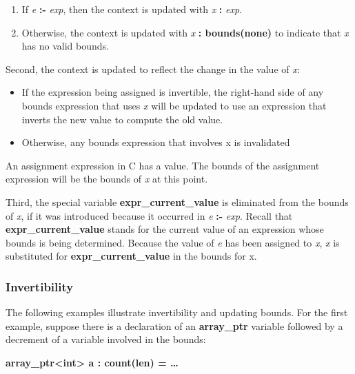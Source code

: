 \documentclass[]{article}
\begin{document}
\begin{enumerate}
\def\labelenumi{\arabic{enumi}.}
\item
  If \emph{e} \textbf{:-} \emph{exp}, then the context is updated with
  \emph{x} \textbf{:} \emph{exp}.
\item
  Otherwise, the context is updated with \emph{x} \textbf{:
  bounds(none)} to indicate that \emph{x} has no valid bounds.
\end{enumerate}

Second, the context is updated to reflect the change in the value of
\emph{x}:

\begin{itemize}
\item
  If the expression being assigned is invertible, the right-hand side of
  any bounds expression that uses \emph{x} will be updated to use an
  expression that inverts the new value to compute the old value.
\item
  Otherwise, any bounds expression that involves x is invalidated
\end{itemize}

An assignment expression in C has a value. The bounds of the assignment
expression will be the bounds of \emph{x} at this point.

Third, the special variable \textbf{expr\_current\_value} is eliminated
from the bounds of \emph{x}, if it was introduced because it occurred in
\emph{e} \textbf{:-} \emph{exp}. Recall that
\textbf{expr\_current\_value} stands for the current value of an
expression whose bounds is being determined. Because the value of
\emph{e} has been assigned to \emph{x}, \emph{x} is substituted for
\textbf{expr\_current\_value} in the bounds for x.

\subsubsection{\texorpdfstring{\protect\hypertarget{ux5fToc435434957}{}{\protect\hypertarget{ux5fToc437460784}{}{\protect\hypertarget{ux5fToc440445463}{}{\protect\hypertarget{ux5fToc440449245}{}{\protect\hypertarget{ux5fToc440551895}{}{}}}}}Invertibility}{Invertibility}}\label{invertibility}

The following examples illustrate invertibility and updating bounds. For
the first example, suppose there is a declaration of an
\textbf{array\_ptr} variable followed by a decrement of a variable
involved in the bounds:

\textbf{array\_ptr\textless{}int\textgreater{} a : count(len) =
\ldots{}}
\end{document}
